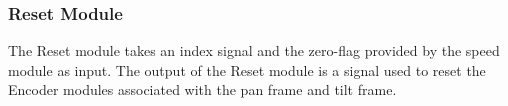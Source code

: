 \documentclass[../../main.tex]{subfiles}
\begin{document}


    





\subsubsection*{Reset Module}
The Reset module takes an index signal and the zero-flag provided by the speed module as input.  The output of the Reset module is a signal used to reset the Encoder modules associated with the pan frame and tilt frame. 

\end{document}

